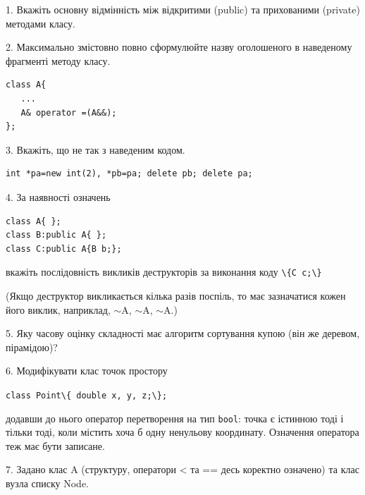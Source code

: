 \documentclass[12pt, ukrainian]{article}
\def\code#1{\Verb!#1!}
\begin{document}
{%
1. Вкажіть основну відмінність між відкритими (public) та прихованими (private) методами класу.%
\par
\vspace{2mm}
2. Максимально змістовно повно сформулюйте назву оголошеного в наведеному фрагменті методу класу.
\vspace{-3mm}
\begin{verbatim}class A{
   ...
   A& operator =(A&&);
};\end{verbatim}
\vspace{-3mm}
\par
\vspace{2mm}
3. Вкажіть, що не так з наведеним кодом.
\vspace{-3mm}
\begin{verbatim}int *pa=new int(2), *pb=pa; delete pb; delete pa;\end{verbatim}
\vspace{-3mm}
\par
\vspace{2mm}
4. За наявності означень
\vspace{-3mm}
\begin{verbatim}
class A{ };
class B:public A{ };
class C:public A{B b;};\end{verbatim}
\vspace{-3mm}
вкажіть послідовність викликів деструкторів за виконання коду \code{\{C c;\}} 

(Якщо деструктор викликається кілька разів поспіль, то має зазначатися кожен його виклик, наприклад, $\sim$A, $\sim$A, $\sim$A.)

\vspace{2mm}
5. Яку часову оцінку складності має алгоритм сортування купою (він же деревом, пірамідою)?
\par
\vspace{2mm}
6. Модифікувати клас точок простору 

\qquad\code{class Point\{ double x, y, z;\};}


додавши до нього оператор перетворення на тип \code{bool}: точка є істинною тоді і тільки тоді, коли містить хоча б одну ненульову координату. Означення оператора теж має бути записане.%
\par
\vspace{2mm}
7. 
Задано клас A (структуру, оператори < та == десь коректно означено) та клас вузла списку Node.

}
\end{document}
